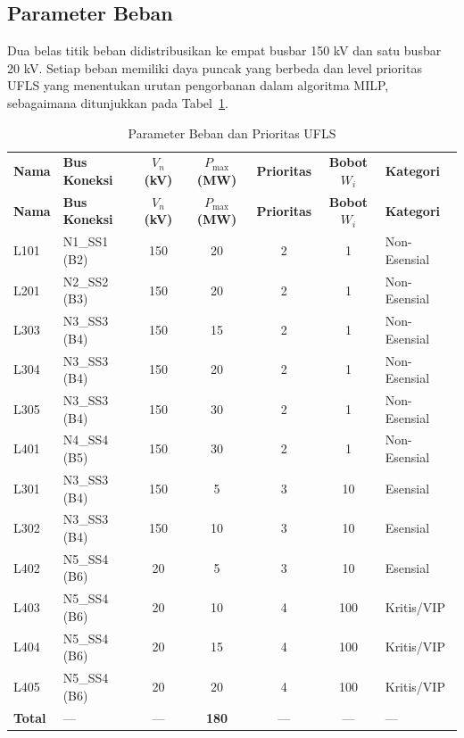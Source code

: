 \subsection{Parameter Beban}
\label{subsec:Parameter_Beban}

Dua belas titik beban didistribusikan ke empat busbar 150 kV dan satu busbar 20 kV.
Setiap beban memiliki daya puncak yang berbeda dan level prioritas UFLS yang menentukan urutan pengorbanan dalam algoritma MILP, sebagaimana ditunjukkan pada Tabel~\ref{tab:beban}.

\begin{longtable}{|l|p{2.8cm}|c|c|c|c|l|}
    \caption{Parameter Beban dan Prioritas UFLS}
    \label{tab:beban}
    \vspace{-0.75em}\\
    \hline
    \textbf{Nama} & \textbf{Bus Koneksi} & \textbf{$V_n$ (kV)} &
    \textbf{$P_{\max}$ (MW)} & \textbf{Prioritas} &
    \textbf{Bobot $W_i$} & \textbf{Kategori} \\ \hline
    \endfirsthead
    \hline
    \textbf{Nama} & \textbf{Bus Koneksi} & \textbf{$V_n$ (kV)} &
    \textbf{$P_{\max}$ (MW)} & \textbf{Prioritas} &
    \textbf{Bobot $W_i$} & \textbf{Kategori} \\ \hline
    \endhead
    L101  & N1\_SS1 (B2) & 150 & 20 & 2 & 1   & Non-Esensial \\ \hline
    L201  & N2\_SS2 (B3) & 150 & 20 & 2 & 1   & Non-Esensial \\ \hline
    L303  & N3\_SS3 (B4) & 150 & 15 & 2 & 1   & Non-Esensial \\ \hline
    L304  & N3\_SS3 (B4) & 150 & 20 & 2 & 1   & Non-Esensial \\ \hline
    L305  & N3\_SS3 (B4) & 150 & 30 & 2 & 1   & Non-Esensial \\ \hline
    L401  & N4\_SS4 (B5) & 150 & 30 & 2 & 1   & Non-Esensial \\ \hline
    L301  & N3\_SS3 (B4) & 150 & 5  & 3 & 10  & Esensial \\ \hline
    L302  & N3\_SS3 (B4) & 150 & 10 & 3 & 10  & Esensial \\ \hline
    L402  & N5\_SS4 (B6) & 20  & 5  & 3 & 10  & Esensial \\ \hline
    L403  & N5\_SS4 (B6) & 20  & 10 & 4 & 100 & Kritis/VIP \\ \hline
    L404  & N5\_SS4 (B6) & 20  & 15 & 4 & 100 & Kritis/VIP \\ \hline
    L405  & N5\_SS4 (B6) & 20  & 20 & 4 & 100 & Kritis/VIP \\ \hline
    \textbf{Total} & --- & --- & \textbf{180} & --- & --- & --- \\ \hline
\end{longtable}

